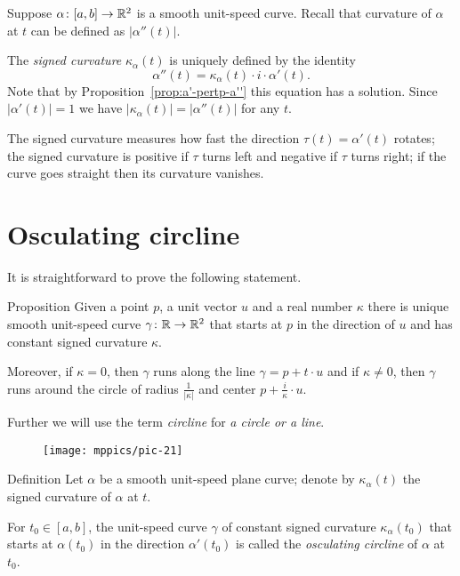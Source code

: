 Suppose $\alpha\colon[a,b]\to\mathbb{R}^2$ is a smooth unit-speed curve.
Recall that curvature of $\alpha$ at $t$ can be defined as $|\alpha''(t)|$.

The \emph{signed curvature} $\kappa_\alpha(t)$ is uniquely defined by
the identity 
\[\alpha''(t)=\kappa_\alpha(t)\cdot i\cdot \alpha'(t).\]
Note that by Proposition~\ref{prop:a'-pertp-a''} this equation has a solution.
Since $|\alpha'(t)|=1$ we have $|\kappa_\alpha(t)|=|\alpha''(t)|$ for any $t$.

The signed curvature measures how fast the direction $\tau(t)=\alpha'(t)$ rotates;
the signed curvature is positive if $\tau $ turns left and negative if $\tau$ turns right;
if the curve goes straight then its curvature vanishes.

\section{Osculating circline}

It is straightforward to prove the following statement.

\begin{thm}{Proposition}\label{prop:circline}
Given a point $p$,
a unit vector $u$ 
and a real number $\kappa$ there is unique smooth unit-speed curve $\gamma\colon\mathbb{R}\to\mathbb{R}^2$ 
that starts at $p$ in the direction of $u$ and has constant signed curvature $\kappa$.

Moreover, if $\kappa=0$, then $\gamma$ runs along the line $\gamma=p+t\cdot u$
and if $\kappa\ne 0$, then $\gamma$ runs around the circle of radius $\tfrac1{|\kappa|}$ and center $p+\tfrac i\kappa\cdot u$. 
\end{thm}

Further we will use the term \emph{circline} for \emph{a circle or a line}.

{

\begin{wrapfigure}{r}{30 mm}
\vskip-4mm
\centering
\texttt{[image: mppics/pic-21]}
\vskip0mm
\end{wrapfigure}

\begin{thm}{Definition}
Let $\alpha$ be a smooth unit-speed plane curve;
denote by $\kappa_\alpha(t)$ the signed curvature of $\alpha$ at $t$.

For $t_0 \in [a,b]$, the unit-speed curve $\gamma$ of constant signed curvature $\kappa_\alpha(t_0)$ that starts at $\alpha(t_0)$ in the direction $\alpha'(t_0)$ is called the \emph{osculating circline} of $\alpha$ at $t_0$.
\end{thm}

}

